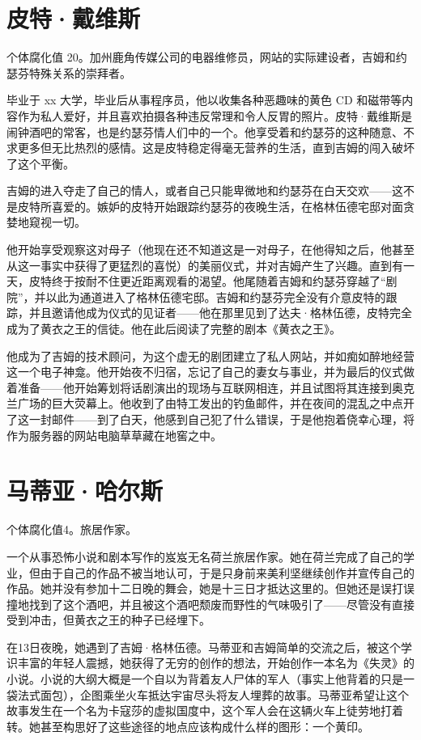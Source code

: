 \section{皮特·戴维斯}

个体腐化值 20。加州鹿角传媒公司的电器维修员，网站的实际建设者，吉姆和约瑟芬特殊关系的崇拜者。

毕业于 xx 大学，毕业后从事程序员，他以收集各种恶趣味的黄色 CD 和磁带等内容作为私人爱好，并且喜欢拍摄各种违反常理和令人反胃的照片。皮特·戴维斯是闹钟酒吧的常客，也是约瑟芬情人们中的一个。他享受着和约瑟芬的这种随意、不求更多但无比热烈的感情。这是皮特稳定得毫无营养的生活，直到吉姆的闯入破坏了这个平衡。

吉姆的进入夺走了自己的情人，或者自己只能卑微地和约瑟芬在白天交欢——这不是皮特所喜爱的。嫉妒的皮特开始跟踪约瑟芬的夜晚生活，在格林伍德宅邸对面贪婪地窥视一切。

他开始享受观察这对母子（他现在还不知道这是一对母子，在他得知之后，他甚至从这一事实中获得了更猛烈的喜悦）的美丽仪式，并对吉姆产生了兴趣。直到有一天，皮特终于按耐不住更近距离观看的渴望。他尾随着吉姆和约瑟芬穿越了“剧院”，并以此为通道进入了格林伍德宅邸。吉姆和约瑟芬完全没有介意皮特的跟踪，并且邀请他成为仪式的见证者——他在那里见到了达夫·格林伍德，皮特完全成为了黄衣之王的信徒。他在此后阅读了完整的剧本《黄衣之王》。

他成为了吉姆的技术顾问，为这个虚无的剧团建立了私人网站，并如痴如醉地经营这一个电子神龛。他开始夜不归宿，忘记了自己的妻女与事业，并为最后的仪式做着准备——他开始筹划将话剧演出的现场与互联网相连，并且试图将其连接到奥克兰广场的巨大荧幕上。他收到了由特工发出的钓鱼邮件，并在夜间的混乱之中点开了这一封邮件——到了白天，他感到自己犯了什么错误，于是他抱着侥幸心理，将作为服务器的网站电脑草草藏在地窖之中。

\section{马蒂亚·哈尔斯}

个体腐化值4。旅居作家。

一个从事恐怖小说和剧本写作的岌岌无名荷兰旅居作家。她在荷兰完成了自己的学业，但由于自己的作品不被当地认可，于是只身前来美利坚继续创作并宣传自己的作品。她并没有参加十二日晚的舞会，她是十三日才抵达这里的。但她还是误打误撞地找到了这个酒吧，并且被这个酒吧颓废而野性的气味吸引了——尽管没有直接受到冲击，但黄衣之王的种子已经埋下。

在13日夜晚，她遇到了吉姆·格林伍德。马蒂亚和吉姆简单的交流之后，被这个学识丰富的年轻人震撼，她获得了无穷的创作的想法，开始创作一本名为《失灵》的小说。小说的大纲大概是一个自以为背着友人尸体的军人（事实上他背着的只是一袋法式面包），企图乘坐火车抵达宇宙尽头将友人埋葬的故事。马蒂亚希望让这个故事发生在一个名为卡寇莎的虚拟国度中，这个军人会在这辆火车上徒劳地打着转。她甚至构思好了这些途径的地点应该构成什么样的图形：一个黄印。

